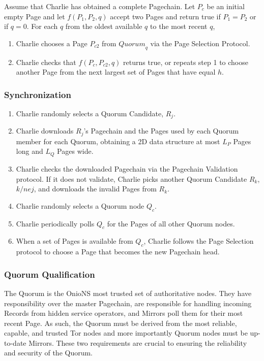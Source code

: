 Assume that Charlie has obtained a complete Pagechain. Let $ P_{c} $ be an initial empty Page and let $ f(P_{1}, P_{2}, q) $ accept two Pages and return true if $ P_{1} = P_{2} $ or if $ q = 0 $. For each $ q $ from the oldest available $ q $ to the most recent $ q $,

\begin{enumerate}
	\item Charlie chooses a Page $ P_{c2} $ from $ \mathit{Quorum}_{q} $ via the Page Selection Protocol.
	\item Charlie checks that $ f(P_{c}, P_{c2}, q) $ returns true, or repeats step 1 to choose another Page from the next largest set of Pages that have equal $ h $.
\end{enumerate}

\subsubsection{Synchronization}

\begin{enumerate}
	\item Charlie randomly selects a Quorum Candidate, $ R_{j} $.
	\item Charlie downloads $ R_{j} $'s Pagechain and the Pages used by each Quorum member for each Quorum, obtaining a 2D data structure at most $ L_{P} $ Pages long and $ L_{Q} $ Pages wide.
	\item Charlie checks the downloaded Pagechain via the Pagechain Validation protocol. If it does not validate, Charlie picks another Quorum Candidate $ R_{k} $, $ k /ne j $, and downloads the invalid Pages from $ R_{k} $.
	\item Charlie randomly selects a Quorum node $ Q_{c} $.
	\item Charlie periodically polls $ Q_{c} $ for the Pages of all other Quorum nodes.
	\item When a set of Pages is available from $ Q_{c} $, Charlie follows the Page Selection protocol to choose a Page that becomes the new Pagechain head.
\end{enumerate}

\subsubsection{Quorum Qualification}

The Quorum is the OnioNS most trusted set of authoritative nodes. They have responsibility over the master Pagechain, are responsible for handling incoming Records from hidden service operators, and Mirrors poll them for their most recent Page. As such, the Quorum must be derived from the most reliable, capable, and trusted Tor nodes and more importantly Quorum nodes must be up-to-date Mirrors. These two requirements are crucial to ensuring the reliability and security of the Quorum.

